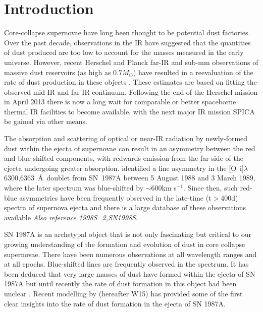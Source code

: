 \documentclass[useAMS,usenatbib,usegraphicx]{mnras}
\begin{document}
\section{Introduction}

Core-collapse supernovae have long been thought to be potential dust 
factories.  Over the past decade, observations in the IR have suggested 
that the quantities of dust produced are too low to account for the masses 
measured in the early universe.  However, recent Herschel and Planck 
far-IR and sub-mm observations of massive dust reservoirs (as high as 
0.7$M_{\odot}$) have resulted in a reevaluation of the rate of dust 
production in these objects \citep{Barlow2010, Matsuura2011, Gomez2012}.  These estimates are based on fitting the observed mid-IR 
and far-IR continuum. Following the end of the Herschel mission in April 
2013 there is now a long wait for comparable or better spaceborne thermal 
IR facilities to become available, with the next major IR mission SPICA 
be gained via other means.
   
The absorption and scattering of optical or near-IR radiation by 
newly-formed dust within the ejecta of supernovae can result in an 
asymmetry between the red and blue shifted components, with redwards 
emission from the far side of the ejecta undergoing greater absorption.  
\citet{Lucy1989} identified a line asymmetry in the [O~{\sc i}]$\lambda$6300,6363~\AA\ doublet
from SN~1987A between 5 August 1988 and 3 March 1989, where the later 
spectrum was blue-shifted by $\sim 600 $km s$^{-1}$. Since then, such 
red-blue asymmetries have been frequently observed in the late-time 
(t$>$400d) spectra of supernova ejecta and there is a large database of 
these observations 
available\citep{Fabbri2011,Lucy1989} \textit{Also reference 1998S\_2,SN1998S}.

SN 1987A is an archetypal object that is not only fascinating but critical to our 
growing understanding of the formation and evolution of dust in core 
collapse supernovae.  There have been numerous observations at all 
wavelength ranges and at all epochs. Blue-shifted lines are frequently 
observed in the spectrum.  It has been deduced that very large masses of 
dust have formed within the ejecta of SN 1987A 
but until recently the rate of dust formation in this object had been 
unclear \citep{Matsuura2011}.  Recent modelling by \citet{Wesson2015} (hereafter W15) has 
provided some of the first clear insights into the rate of dust formation 
in the ejecta of SN 1987A.
\end{document}
